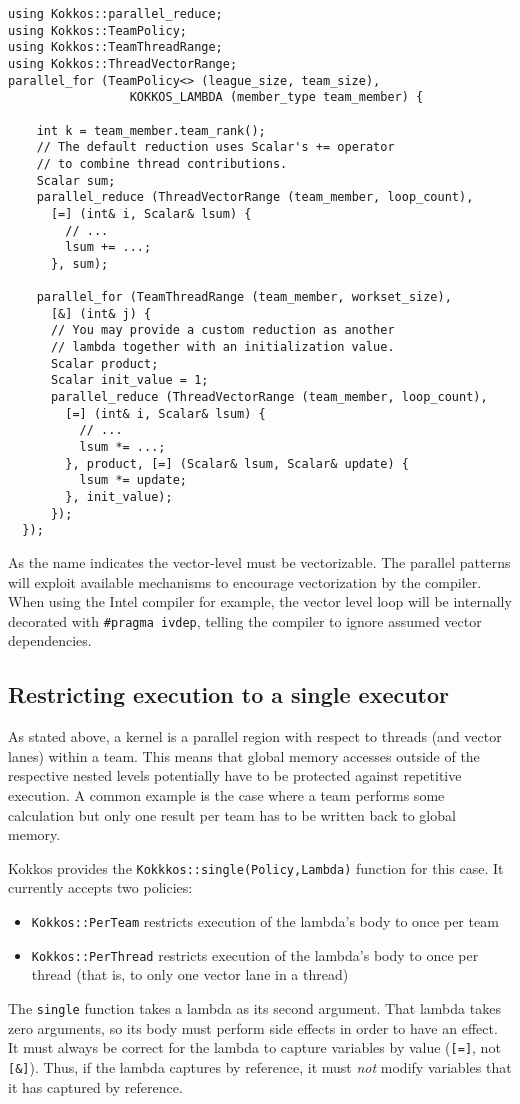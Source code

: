 \begin{lstlisting}
using Kokkos::parallel_reduce;
using Kokkos::TeamPolicy;
using Kokkos::TeamThreadRange;
using Kokkos::ThreadVectorRange;
parallel_for (TeamPolicy<> (league_size, team_size),
                 KOKKOS_LAMBDA (member_type team_member) {

    int k = team_member.team_rank();
    // The default reduction uses Scalar's += operator
    // to combine thread contributions.
    Scalar sum;
    parallel_reduce (ThreadVectorRange (team_member, loop_count),
      [=] (int& i, Scalar& lsum) {
        // ...
        lsum += ...;
      }, sum);

    parallel_for (TeamThreadRange (team_member, workset_size),
      [&] (int& j) {
      // You may provide a custom reduction as another
      // lambda together with an initialization value.
      Scalar product;
      Scalar init_value = 1;
      parallel_reduce (ThreadVectorRange (team_member, loop_count),
        [=] (int& i, Scalar& lsum) {
          // ...
          lsum *= ...;
        }, product, [=] (Scalar& lsum, Scalar& update) {
          lsum *= update;
        }, init_value);
      });
  });
\end{lstlisting}  

As the name indicates the vector-level must be vectorizable. 
The parallel patterns will exploit available mechanisms to encourage vectorization by the compiler. 
When using the Intel compiler for example, the vector level loop will be internally decorated with 
\lstinline|#pragma ivdep|, telling the compiler to ignore assumed vector dependencies.

\subsection{Restricting execution to a single executor}

As stated above, a kernel is a parallel region with respect to threads (and vector lanes) within a team.
This means that global memory accesses outside of the respective nested levels potentially have to be protected against repetitive execution. 
A common example is the case where a team performs some calculation but only one result per team has to be written back to global memory. 

Kokkos provides the \lstinline|Kokkkos::single(Policy,Lambda)| function for this case.
It currently accepts two policies:
\begin{itemize}
\item \lstinline|Kokkos::PerTeam| restricts execution of the lambda's
  body to once per team
\item \lstinline|Kokkos::PerThread| restricts execution of the
  lambda's body to once per thread (that is, to only one vector lane
  in a thread)
\end{itemize}
The \lstinline|single| function takes a lambda as its second argument.
That lambda takes zero arguments, 
so its body must perform side effects in order to have an effect.
It must always be correct for the lambda to capture variables by value
(\lstinline|[=]|, not \lstinline|[&]|).
Thus, if the lambda captures by reference,
it must \emph{not} modify variables that it has captured by reference.

